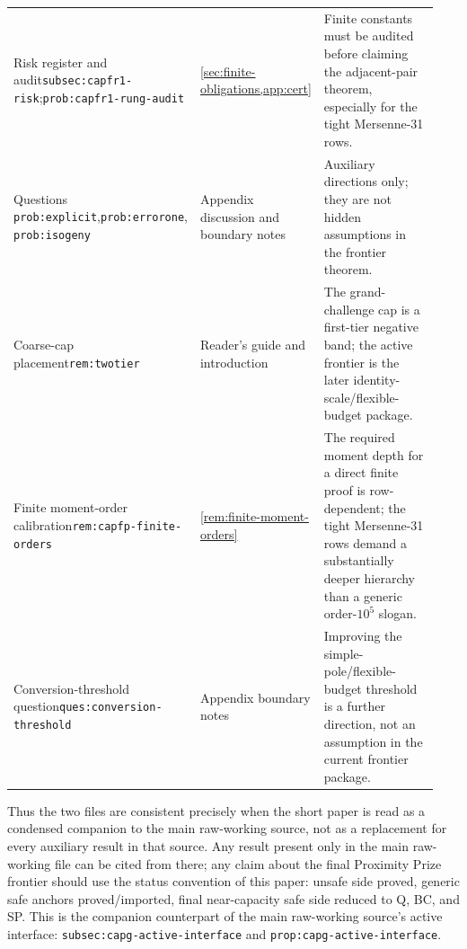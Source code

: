 \documentclass[11pt]{article}
\theoremstyle{definition}
\theoremstyle{remark}
\begin{document}
\begin{center}
\begin{tabular}{@{}>{\raggedright\arraybackslash}p{0.30\linewidth}>{\raggedright\arraybackslash}p{0.24\linewidth}>{\raggedright\arraybackslash}p{0.40\linewidth}@{}}
Risk register and audit\newline\texttt{subsec:capfr1-risk};\newline\texttt{prob:capfr1-rung-audit} & \cref{sec:finite-obligations,app:cert} & Finite constants must be audited before claiming the adjacent-pair theorem, especially for the tight Mersenne-31 rows. \\
Questions \texttt{prob:explicit},\newline\texttt{prob:errorone}, \texttt{prob:isogeny} & Appendix discussion and boundary notes & Auxiliary directions only; they are not hidden assumptions in the frontier theorem. \\
Coarse-cap placement\newline\texttt{rem:twotier} & Reader's guide and introduction & The grand-challenge cap is a first-tier negative band; the active frontier is the later identity-scale/flexible-budget package. \\
Finite moment-order calibration\newline\texttt{rem:capfp-finite-orders} & \cref{rem:finite-moment-orders} & The required moment depth for a direct finite proof is row-dependent; the tight Mersenne-31 rows demand a substantially deeper hierarchy than a generic order-\(10^5\) slogan. \\
Conversion-threshold question\newline\texttt{ques:conversion-threshold} & Appendix boundary notes & Improving the simple-pole/flexible-budget threshold is a further direction, not an assumption in the current frontier package. \\
\bottomrule
\end{tabular}
\end{center}

Thus the two files are consistent precisely when the short paper is read as a
condensed companion to the main raw-working source, not as a replacement for every
auxiliary result in that source.  Any result present only in the main raw-working
file can be cited from there; any claim about the final Proximity Prize frontier
should use the status convention of this paper: unsafe side proved, generic
safe anchors proved/imported, final near-capacity safe side reduced to Q, BC,
and SP.  This is the companion counterpart of the main raw-working source's active interface: \texttt{subsec:capg-active-interface} and \texttt{prop:capg-active-interface}.
\end{document}
